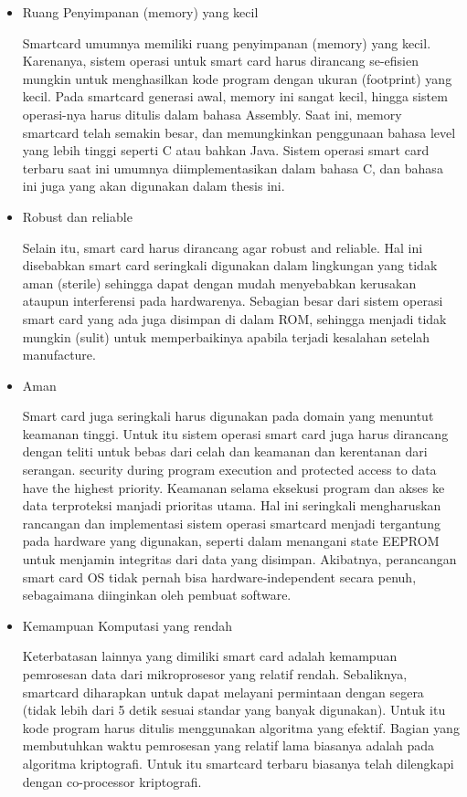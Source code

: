 \documentclass[a4paper, 12pt]{report}
\begin{document}
\begin{itemize}

\item Ruang Penyimpanan (memory) yang kecil

Smartcard umumnya memiliki ruang penyimpanan (memory) yang kecil. Karenanya, sistem operasi untuk smart card harus dirancang se-efisien mungkin untuk menghasilkan kode program dengan ukuran (footprint) yang kecil. Pada smartcard generasi awal, memory ini sangat kecil, hingga sistem operasi-nya harus ditulis dalam bahasa Assembly. Saat ini, memory smartcard telah semakin besar, dan memungkinkan penggunaan bahasa level yang lebih tinggi seperti C atau bahkan Java. Sistem operasi smart card terbaru saat ini umumnya diimplementasikan dalam bahasa C, dan bahasa ini juga yang akan digunakan dalam thesis ini.

\item Robust dan reliable

Selain itu, smart card harus dirancang agar robust and reliable. Hal ini disebabkan smart card seringkali digunakan dalam lingkungan yang tidak aman (sterile) sehingga dapat dengan mudah menyebabkan kerusakan ataupun interferensi pada hardwarenya. Sebagian besar dari sistem operasi smart card yang ada juga disimpan di dalam ROM, sehingga menjadi tidak mungkin (sulit) untuk memperbaikinya apabila terjadi kesalahan setelah manufacture.

\item Aman

Smart card juga seringkali harus digunakan pada domain yang menuntut keamanan tinggi. Untuk itu sistem operasi smart card juga harus dirancang dengan teliti untuk bebas dari celah dan keamanan dan kerentanan dari serangan. security during program execution and protected access to data have the highest priority. Keamanan selama eksekusi program dan akses ke data terproteksi manjadi prioritas utama. Hal ini seringkali mengharuskan rancangan dan implementasi sistem operasi smartcard menjadi tergantung pada hardware yang digunakan, seperti dalam menangani state  EEPROM untuk menjamin integritas dari data yang disimpan. Akibatnya, perancangan smart card OS tidak pernah bisa hardware-independent secara penuh, sebagaimana diinginkan oleh pembuat software.

\item Kemampuan Komputasi yang rendah

Keterbatasan lainnya yang dimiliki smart card adalah kemampuan pemrosesan data dari mikroprosesor yang relatif rendah. Sebaliknya, smartcard diharapkan untuk dapat melayani permintaan dengan segera (tidak lebih dari 5 detik sesuai standar yang banyak digunakan). Untuk itu kode program harus ditulis menggunakan algoritma yang efektif. Bagian yang membutuhkan waktu pemrosesan yang relatif lama biasanya adalah pada algoritma kriptografi. Untuk itu smartcard terbaru biasanya telah dilengkapi dengan co-processor kriptografi.

\end{itemize}
\end{document}
